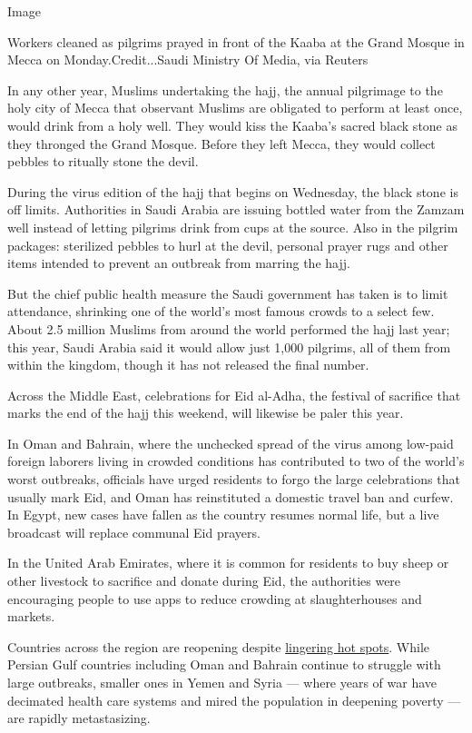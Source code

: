 Image

Workers cleaned as pilgrims prayed in front of the Kaaba at the Grand
Mosque in Mecca on Monday.Credit...Saudi Ministry Of Media, via Reuters

In any other year, Muslims undertaking the hajj, the annual pilgrimage
to the holy city of Mecca that observant Muslims are obligated to
perform at least once, would drink from a holy well. They would kiss the
Kaaba's sacred black stone as they thronged the Grand Mosque. Before
they left Mecca, they would collect pebbles to ritually stone the devil.

During the virus edition of the hajj that begins on Wednesday, the black
stone is off limits. Authorities in Saudi Arabia are issuing bottled
water from the Zamzam well instead of letting pilgrims drink from cups
at the source. Also in the pilgrim packages: sterilized pebbles to hurl
at the devil, personal prayer rugs and other items intended to prevent
an outbreak from marring the hajj.

But the chief public health measure the Saudi government has taken is to
limit attendance, shrinking one of the world's most famous crowds to a
select few. About 2.5 million Muslims from around the world performed
the hajj last year; this year, Saudi Arabia said it would allow just
1,000 pilgrims, all of them from within the kingdom, though it has not
released the final number.

Across the Middle East, celebrations for Eid al-Adha, the festival of
sacrifice that marks the end of the hajj this weekend, will likewise be
paler this year.

In Oman and Bahrain, where the unchecked spread of the virus among
low-paid foreign laborers living in crowded conditions has contributed
to two of the world's worst outbreaks, officials have urged residents to
forgo the large celebrations that usually mark Eid, and Oman has
reinstituted a domestic travel ban and curfew. In Egypt, new cases have
fallen as the country resumes normal life, but a live broadcast will
replace communal Eid prayers.

In the United Arab Emirates, where it is common for residents to buy
sheep or other livestock to sacrifice and donate during Eid, the
authorities were encouraging people to use apps to reduce crowding at
slaughterhouses and markets.

Countries across the region are reopening despite
\href{https://www.nytimes3xbfgragh.onion/interactive/2020/world/coronavirus-maps.html\#countries}{lingering
hot spots}. While Persian Gulf countries including Oman and Bahrain
continue to struggle with large outbreaks, smaller ones in Yemen and
Syria --- where years of war have decimated health care systems and
mired the population in deepening poverty --- are rapidly metastasizing.

